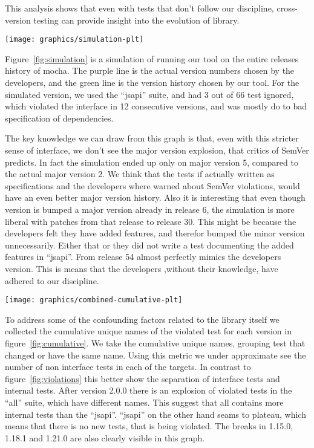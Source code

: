 This analysis shows that even with tests that don't follow our
discipline, cross-version testing can provide insight into the
evolution of library.

\begin{figure*}
\centering
\texttt{[image: graphics/simulation-plt]}
\caption{Simulation of version histories}%
\label{fig:simulation}
\end{figure*}

Figure~\ref{fig:simulation} is a simulation of running our tool 
on the entire releases history of mocha. The purple line is the 
actual version numbers chosen by the developers, and the green line is the
version history chosen by our tool.  For the simulated version, we used the
``jsapi'' suite, and had 3 out of 66 test ignored,
which violated the interface in 12 consecutive versions, and was mostly do to
bad specification of dependencies. 

The key knowledge we can draw from this graph is that, even with this stricter
sense of interface, we don't see the major version explosion, that critics of
SemVer predicts. In fact the simulation ended up only on major version 5,
compared to the actual major version 2. We think that the tests if actually
written as specifications and the developers where warned about SemVer
violations, would have an even better major version history.
Also it is interesting that even though version is bumped a major version
already in release 6, the simulation is more liberal with patches from that 
release to release 30. This might be because the developers felt they have added 
features, and therefor bumped the minor version unnecessarily. Either that
or they did not write a test documenting the added features in ``jsapi''. From 
release 54 almost perfectly mimics the developers version. This is means that the
developers ,without their knowledge, have adhered to our discipline. 

\begin{figure*}
\centering
\texttt{[image: graphics/combined-cumulative-plt]}
\caption{Cumulative names of violated tests} 
\label{fig:cumulative}
\end{figure*}

To address some of the confounding factors related to the library itself we
collected the cumulative unique names of the violated test for each version in
figure~\ref{fig:cumulative}. We take the cumulative unique names, grouping test
that changed or have the same name. Using this metric we under approximate see
the number of non interface tests in each of the targets. In contrast to
figure~\ref{fig:violations} this better show the separation of interface tests
and internal tests. After version 2.0.0 there is an explosion of violated tests
in the ``all'' suite, which have different names. This suggest that all
contains more internal tests than the ``jsapi''. ``jsapi'' on the other hand
seams to plateau, which means that there is no new tests, that is being
violated. The breaks in 1.15.0, 1.18.1 and 1.21.0 are also clearly visible in
this graph. 


